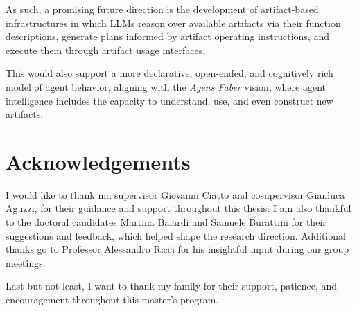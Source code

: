 \documentclass[12pt,a4paper,openright,twoside]{book}
\begin{document}
As such, a promising future direction is the development of artifact-based infrastructures in which \acp{LLM} reason over available artifacts via their function descriptions, generate plans informed by artifact operating instructions, and execute them through artifact usage interfaces.

This would also support a more declarative, open-ended, and cognitively rich model of agent behavior, aligning with the \textit{Agens Faber} vision, where agent intelligence includes the capacity to understand, use, and even construct new artifacts.

\chapter*{Acknowledgements}

I would like to thank mu supervisor Giovanni Ciatto and cosupervisor Gianluca Aguzzi, for their guidance and support throughout this thesis.
%
I am also thankful to the doctoral candidates Martina Baiardi and Samuele Burattini for their suggestions and feedback, which helped shape the research direction.
%
Additional thanks go to Professor Alessandro Ricci for his insightful input during our group meetings.

Last but not least, I want to thank my family for their support, patience, and encouragement throughout this master's program.


\backmatter%
\printbibliography[heading=bibintoc]%
\end{document}
